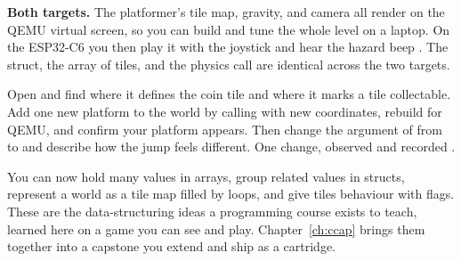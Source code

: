 \begin{prgtargets}
\textbf{Both targets.} The platformer's tile map, gravity, and camera all render on
the QEMU virtual screen, so you can build and tune the whole level on a laptop. On
the ESP32\nobreakdash-C6 you then play it with the joystick and hear the hazard beep
\citep{prg32qemu}. The struct, the array of tiles, and the physics call are
identical across the two targets.
\end{prgtargets}

\begin{prgtry}
Open  and find where it defines the coin
tile and where it marks a tile collectable. Add one new platform to the world by
calling  with new coordinates, rebuild for QEMU, and confirm your
platform appears. Then change the  argument of
 from  to  and describe how the
jump feels different. One change, observed and recorded \citep{prg32repo}.
\end{prgtry}

\begin{prgcheck}
You can now hold many values in arrays, group related values in structs, represent
a world as a tile map filled by loops, and give tiles behaviour with flags. These
are the data-structuring ideas a programming course exists to teach, learned here
on a game you can see and play. Chapter~\ref{ch:ccap} brings them together into a
capstone you extend and ship as a cartridge.
\end{prgcheck}
